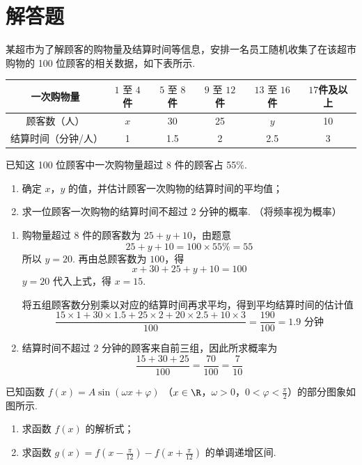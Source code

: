 \section{解答题}

\begin{problem}
某超市为了解顾客的购物量及结算时间等信息，安排一名员工随机收集了在该超市购物的 100 位顾客的相关数据，如下表所示.

\begin{center}
\begin{tabular}{c|ccccc}
一次购物量 & \(1\text{\ 至\ }4\)件 & \(5\text{\ 至\ }8\)件 & \(9\text{\ 至\ }12\)件 & \(13\text{\ 至\ }16\)件 & \(17\)件及以上 \\
\hline
顾客数（人） & \(x\) & 30 & 25 & \(y\) & 10 \\
\hline
结算时间（分钟/人） & 1 & 1.5 & 2 & 2.5 & 3
\end{tabular}
\end{center}

已知这 100 位顾客中一次购物量超过 8 件的顾客占 55\%.
\begin{enumerate}
\item 确定 \(x\)，\(y\) 的值，并估计顾客一次购物的结算时间的平均值；
\item 求一位顾客一次购物的结算时间不超过 2 分钟的概率. （将频率视为概率）
\end{enumerate}

\end{problem}

\begin{solution}
\begin{enumerate}
\item 购物量超过 \(8\) 件的顾客数为 \(25+y+10\)，由题意
\[
25+y+10=100\times55\%=55
\]
所以 \(y=20\). 再由总顾客数为 \(100\)，得
\[
x+30+25+y+10=100
\]
\(y=20\) 代入上式，得 \(x=15\).

将五组顾客数分别乘以对应的结算时间再求平均，得到平均结算时间的估计值
\[
\frac{15\times1+30\times1.5+25\times2+20\times2.5+10\times3}{100}
=\frac{190}{100}=1.9\text{ 分钟}
\]
\item 结算时间不超过 \(2\) 分钟的顾客来自前三组，因此所求概率为
\[
\frac{15+30+25}{100}=\frac{70}{100}=\frac{7}{10}
\]
\end{enumerate}
\end{solution}

\begin{problem}
已知函数 \( f(x) = A \sin (\omega x + \varphi) \) （\(x \in \R\)，\(\omega > 0\)，\(0 < \varphi < \tfrac{\pi}{2}\)）的部分图象如图所示.

\begin{enumerate}
\item 求函数 \( f(x) \) 的解析式；
\item 求函数 \( g(x)=f\left(x-\frac{\pi}{12}\right)-f\left(x+\frac{\pi}{12}\right) \) 的单调递增区间.
\end{enumerate}

\end{problem}

